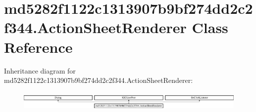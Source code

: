 \hypertarget{classmd5282f1122c1313907b9bf274dd2c2f344_1_1ActionSheetRenderer}{}\section{md5282f1122c1313907b9bf274dd2c2f344.\+Action\+Sheet\+Renderer Class Reference}
\label{classmd5282f1122c1313907b9bf274dd2c2f344_1_1ActionSheetRenderer}
Inheritance diagram for md5282f1122c1313907b9bf274dd2c2f344.\+Action\+Sheet\+Renderer\+:\begin{figure}[H]
\begin{center}
\leavevmode
\includegraphics[height=0.974761cm]{classmd5282f1122c1313907b9bf274dd2c2f344_1_1ActionSheetRenderer}
\end{center}
\end{figure}
